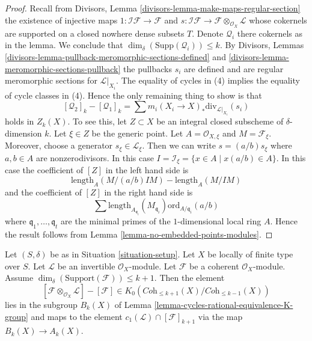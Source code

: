 \begin{proof}
Recall from Divisors, Lemma \ref{divisors-lemma-make-maps-regular-section}
the existence of injective maps
$1 : \mathcal{I}\mathcal{F} \to \mathcal{F}$ and
$s : \mathcal{I}\mathcal{F} \to \mathcal{F} \otimes_{\mathcal{O}_X}\mathcal{L}$
whose cokernels are supported on a closed nowhere dense subsets $T$.
Denote $\mathcal{Q}_i$ there cokernels as in the lemma.
We conclude that $\dim_\delta(\text{Supp}(\mathcal{Q}_i)) \leq k$.
By Divisors, Lemmas \ref{divisors-lemma-pullback-meromorphic-sections-defined}
and \ref{divisors-lemma-meromorphic-sections-pullback} the pullbacks $s_i$
are defined and are regular meromorphic sections for $\mathcal{L}|_{X_i}$.
The equality of cycles in (4) implies the equality of cycle classes
in (4). Hence the only remaining thing to show is that
$$
[\mathcal{Q}_2]_k - [\mathcal{Q}_1]_k
=
\sum m_i(X_i \to X)_*\text{div}_{\mathcal{L}|_{X_i}}(s_i)
$$
holds in $Z_k(X)$. To see this, let $Z \subset X$ be an integral closed
subscheme of $\delta$-dimension $k$. Let $\xi \in Z$ be the generic point.
Let $A = \mathcal{O}_{X, \xi}$ and $M = \mathcal{F}_\xi$.
Moreover, choose a generator $s_\xi \in \mathcal{L}_\xi$.
Then we can write $s = (a/b) s_\xi$ where $a, b \in A$ are
nonzerodivisors. In this case
$I = \mathcal{I}_\xi = \{x \in A \mid x(a/b) \in A\}$.
In this case the coefficient of $[Z]$ in the left hand side is
$$
\text{length}_A(M/(a/b)IM) - \text{length}_A(M/IM)
$$
and the coefficient of $[Z]$ in the right hand side
is
$$
\sum
\text{length}_{A_{\mathfrak q_i}}(M_{\mathfrak q_i})
\text{ord}_{A/\mathfrak q_i}(a/b)
$$
where $\mathfrak q_1, \ldots, \mathfrak q_t$ are the minimal
primes of the $1$-dimensional local ring $A$. Hence the result
follows from Lemma \ref{lemma-no-embedded-points-modules}.
\end{proof}

\begin{lemma}
\label{lemma-coherent-sheaf-cap-c1}
Let $(S, \delta)$ be as in Situation \ref{situation-setup}.
Let $X$ be locally of finite type over $S$.
Let $\mathcal{L}$ be an invertible $\mathcal{O}_X$-module.
Let $\mathcal{F}$ be a coherent $\mathcal{O}_X$-module.
Assume $\dim_\delta(\text{Support}(\mathcal{F})) \leq k + 1$.
Then the element
$$
[\mathcal{F} \otimes_{\mathcal{O}_X} \mathcal{L}]
-
[\mathcal{F}]
\in
K_0(\textit{Coh}_{\leq k + 1}(X)/\textit{Coh}_{\leq k - 1}(X))
$$
lies in the subgroup $B_k(X)$ of
Lemma \ref{lemma-cycles-rational-equivalence-K-group} and maps to
the element $c_1(\mathcal{L}) \cap [\mathcal{F}]_{k + 1}$ via
the map $B_k(X) \to A_k(X)$.
\end{lemma}

